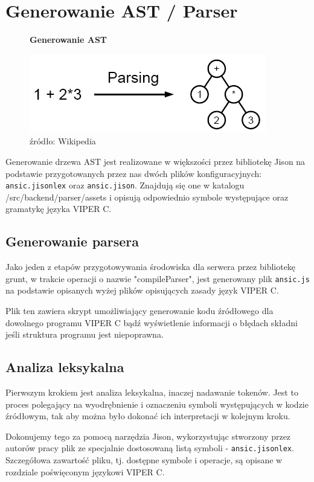 \documentclass[a4paper,twoside,openright,11pt]{report}
\begin{document}
  \section {Generowanie AST / Parser}

\begin{figure}[H]
  \centering
  \textbf{Generowanie AST}\par\medskip
  \includegraphics[scale=0.7]{parsing}
  \caption{źródło: Wikipedia}
\end{figure}


\par Generowanie drzewa AST jest realizowane w większości przez bibliotekę Jison na podstawie przygotowanych przez nas dwóch plików konfiguracyjnych: \texttt{ansic.jisonlex} oraz \texttt{ansic.jison}. Znajdują się one w katalogu /src/backend/parser/assets i opisują odpowiednio symbole występujące oraz gramatykę języka VIPER C.

  \subsection {Generowanie parsera}
\par Jako jeden z etapów przygotowywania środowiska dla serwera przez bibliotekę grunt, w trakcie operacji o nazwie "compileParser", jest generowany plik \texttt{ansic.js} na podstawie opisanych wyżej plików opisujących zasady język VIPER C. 
\par Plik ten zawiera skrypt umożliwiający generowanie kodu źródłowego dla dowolnego programu VIPER C bądź wyświetlenie informacji o błędach składni jeśli struktura programu jest niepoprawna. 

  \subsection {Analiza leksykalna}
\par Pierwszym krokiem jest analiza leksykalna, inaczej nadawanie tokenów. Jest to proces polegający na wyodrębnienie i oznaczeniu symboli występujących w kodzie źródłowym, tak aby można było dokonać ich interpretacji w kolejnym kroku. 
\par Dokonujemy tego za pomocą narzędzia Jison, wykorzystując stworzony przez autorów pracy plik ze specjalnie dostosowaną listą symboli - \texttt{ansic.jisonlex}. Szczegółowa zawartość pliku, tj. dostępne symbole i operacje, są opisane w rozdziale poświęconym językowi VIPER C.
\end{document}
